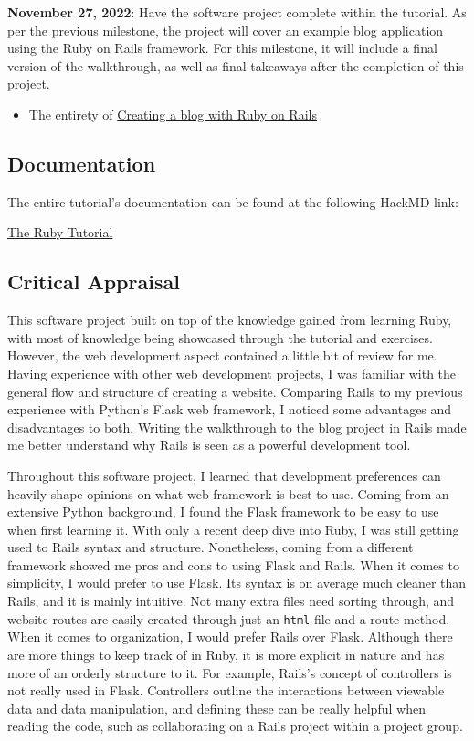 \documentclass{article}
\theoremstyle{theorem}
\theoremstyle{definition}
\theoremstyle{remark}
\begin{document}
\noindent \textbf{November 27, 2022}: Have the software project complete within the tutorial. As per the previous milestone, the project will cover an example blog application using the Ruby on Rails framework. For this milestone, it will include a final version of the walkthrough, as well as final takeaways after the completion of this project.
\begin{itemize}
    \item The entirety of \href{https://hackmd.io/@evrahnos/ryTuitp8o}{Creating a blog with Ruby on Rails}
\end{itemize}

\newpage

\subsection{Documentation}

The entire tutorial's documentation can be found at the following HackMD link:

\href{https://hackmd.io/@evrahnos/rJyCCKdri}{The Ruby Tutorial}

\subsection{Critical Appraisal}

This software project built on top of the knowledge gained from learning Ruby, with most of knowledge being showcased through the tutorial and exercises. However, the web development aspect contained a little bit of review for me. Having experience with other web development projects, I was familiar with the general flow and structure of creating a website. Comparing Rails to my previous experience with Python's Flask web framework, I noticed some advantages and disadvantages to both. Writing the walkthrough to the blog project in Rails made me better understand why Rails is seen as a powerful development tool.

Throughout this software project, I learned that development preferences can heavily shape opinions on what web framework is best to use. Coming from an extensive Python background, I found the Flask framework to be easy to use when first learning it. With only a recent deep dive into Ruby, I was still getting used to Rails syntax and structure. Nonetheless, coming from a different framework showed me pros and cons to using Flask and Rails. When it comes to simplicity, I would prefer to use Flask. Its syntax is on average much cleaner than Rails, and it is mainly intuitive. Not many extra files need sorting through, and website routes are easily created through just an \texttt{html} file and a route method. When it comes to organization, I would prefer Rails over Flask. Although there are more things to keep track of in Ruby, it is more explicit in nature and has more of an orderly structure to it. For example, Rails's concept of controllers is not really used in Flask. Controllers outline the interactions between viewable data and data manipulation, and defining these can be really helpful when reading the code, such as collaborating on a Rails project within a project group.
\end{document}
